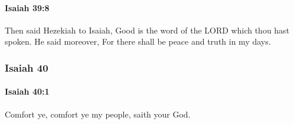 		\paragraph{Isaiah 39:8} %
			\label{ISAIAH-39-8}

			Then said Hezekiah to Isaiah, Good is the word of the LORD which thou hast spoken. He said moreover, For there shall be peace and truth in my days.

	\subsubsection{Isaiah 40} %
		\label{ISAIAH-40}

		\paragraph{Isaiah 40:1} %
			\label{ISAIAH-40-1}

			Comfort ye, comfort ye my people, saith your God.

